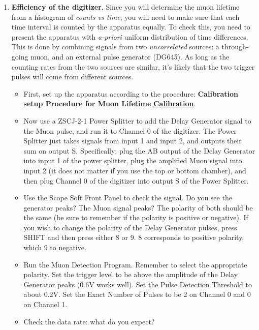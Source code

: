 \documentclass{../lab}
\begin{document}
\begin{enumerate}
    \item \textbf{Efficiency of the digitizer}. Since you will determine the muon lifetime from a histogram of \emph{counts vs time}, you will need to make sure that each time interval is counted by the apparatus equally. To check this, you need to present the apparatus with \emph{a-priori} uniform distribution of time differences. This is done by combining signals from two \emph{uncorrelated} sources: a through-going muon, and an external pulse generator (DG645). As long as the counting rates from the two sources are similar, it's likely that the two trigger pulses will come from different sources.

    \begin{itemize}
        \item First, set up the apparatus according to the procedure: \textbf{Calibration setup Procedure for Muon Lifetime} \href{http://experimentationlab.berkeley.edu/node/91}{\textbf{Calibration}}.

        \item Now use a ZSCJ-2-1 Power Splitter to add the Delay Generator signal to the Muon pulse, and run it to Channel 0 of the digitizer. The Power Splitter just takes signals from input 1 and input 2, and outputs their sum on output S. Specifically: plug the AB output of the Delay Generator into input 1 of the power splitter, plug the amplified Muon signal into input 2 (it does not matter if you use the top or bottom chamber), and then plug Channel 0 of the digitizer into output S of the Power Splitter.

        \item Use the Scope Soft Front Panel to check the signal. Do you see the generator peaks? The Muon signal peaks? The polarity of both should be the same (be sure to remember if the polarity is positive or negative). If you wish to change the polarity of the Delay Generator pulses, press SHIFT and then press either 8 or 9. 8 corresponds to positive polarity, which 9 to negative.

        \item Run the Muon Detection Program. Remember to select the appropriate polarity. Set the trigger level to be above the amplitude of the Delay Generator peaks (0.6V works well). Set the Pulse Detection Threshold to about 0.2V. Set the Exact Number of Pulses to be 2 on Channel 0 and 0 on Channel 1.

        \item Check the data rate: what do you expect?


\end{itemize}
\end{enumerate}
\end{document}
